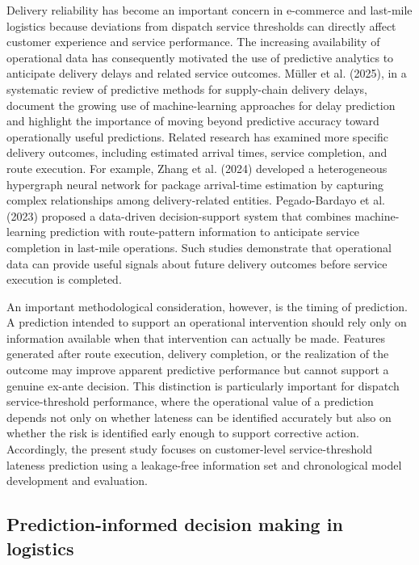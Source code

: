 \documentclass[11pt,a4paper]{article}
\begin{document}
Delivery reliability has become an important concern in e-commerce and
last-mile logistics because deviations from dispatch service thresholds can
directly affect customer experience and service performance. The
increasing availability of operational data has consequently motivated
the use of predictive analytics to anticipate delivery delays and
related service outcomes. Müller et al. (2025), in a systematic review
of predictive methods for supply-chain delivery delays, document the
growing use of machine-learning approaches for delay prediction and
highlight the importance of moving beyond predictive accuracy toward
operationally useful predictions. Related research has examined more
specific delivery outcomes, including estimated arrival times, service
completion, and route execution. For example, Zhang et al. (2024)
developed a heterogeneous hypergraph neural network for package
arrival-time estimation by capturing complex relationships among
delivery-related entities. Pegado-Bardayo et al. (2023) proposed a
data-driven decision-support system that combines machine-learning
prediction with route-pattern information to anticipate service
completion in last-mile operations. Such studies demonstrate that
operational data can provide useful signals about future delivery
outcomes before service execution is completed.

An important methodological consideration, however, is the timing of
prediction. A prediction intended to support an operational intervention
should rely only on information available when that intervention can
actually be made. Features generated after route execution, delivery
completion, or the realization of the outcome may improve apparent
predictive performance but cannot support a genuine ex-ante decision.
This distinction is particularly important for dispatch service-threshold
performance, where the operational value of a prediction depends not
only on whether lateness can be identified accurately but also on
whether the risk is identified early enough to support corrective
action. Accordingly, the present study focuses on customer-level
service-threshold lateness prediction using a leakage-free information set
and chronological model development and evaluation.

\subsection{Prediction-informed decision making in logistics}\label{sec:lit-decision-making}
\end{document}
